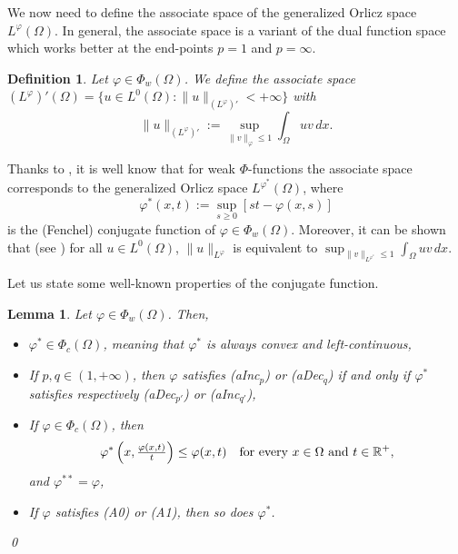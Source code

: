 \documentclass[a4paper,11pt,oneside,notitlepage]{article}
\newtheorem{lemma}[theorem]{Lemma}
\newtheorem{definition}[theorem]{Definition}
\numberwithin{equation}{section}
\def\R{\mathbb{R}}
\newcommand{\vphi}{\varphi}
\begin{document}
We now need to define the associate space of the generalized Orlicz space $L^\vphi(\Omega)$. In general, the associate space is a variant of the dual function space which works better at the end-points $p = 1$ and $p = \infty$. 
\begin{definition}
\label{def:dual}
    Let $\vphi \in \Phi_w(\Omega)$. We define the associate space $(L^\vphi)'(\Omega)=\{u \in L^0(\Omega):  \|u\|_{(L^\vphi)'}<+\infty\}$ with
    \begin{equation*}
        \|u\|_{(L^\vphi)'} := \sup_{\|v\|_\vphi \le 1} \int_\Omega uv \, dx.
    \end{equation*}
\end{definition}

Thanks to \cite[Theorem 3.4.6]{HaH}, it is well know that for weak $\Phi$-functions the associate space corresponds to the generalized Orlicz space $L^{\vphi^*}(\Omega)$, where
\begin{equation*}
    \vphi^*(x, t) := \sup_{s \ge 0} [st - \vphi(x, s)]
\end{equation*}
is the (Fenchel) conjugate function of $\vphi \in \Phi_w(\Omega)$. Moreover, it can be shown that (see \cite[Theorem 3.4.6]{EHH}) for all $u \in L^0(\Omega)$, $\|u\|_{L^{\varphi}}$  is equivalent to $\sup_{\|v\|_{L^{\vphi^*}} \le 1} \int_\Omega uv \, dx.$

Let us state some well-known properties of the conjugate function.

\begin{lemma}
\label{lmm:prop_conj}
    Let $\vphi \in \Phi_w(\Omega)$. Then,
    \begin{itemize}
        \item[(i)] $\vphi^* \in \Phi_c(\Omega)$, meaning that $\vphi^*$ is always convex and left-continuous,
        
        \item[(ii)] If $p,q \in (1,+\infty)$, then $\vphi$ satisfies (aInc$_p$) or (aDec$_q$) if and only if $\vphi^*$ satisfies respectively (aDec$_{p'}$) or (aInc$_{q'}$),
        
        \item[(iii)] If $\vphi \in \Phi_c(\Omega)$, then
        \begin{equation*}
            \vphi^*\left(x, \tfrac{\vphi(x, t)}{t}\right) \le \vphi(x, t) \quad \textnormal{for every } x \in \Omega \textnormal{ and } t \in \R^+,
        \end{equation*}
        and $\vphi^{**} = \vphi$,
        
        \item[(iv)] If $\vphi$ satisfies (A0) or (A1), then so does $\vphi^*$.
    \end{itemize}
    \qed
\end{lemma}
\end{document}
